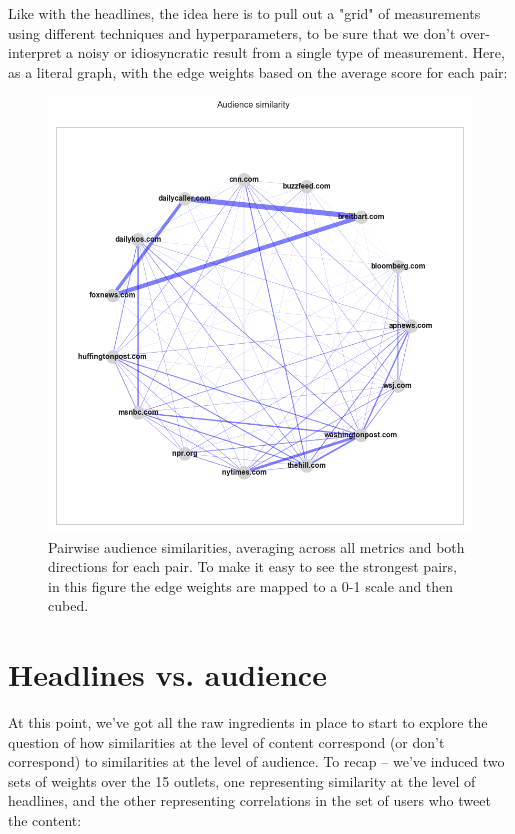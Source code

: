 \documentclass{scrartcl}
\begin{document}
Like with the headlines, the idea here is to pull out a "grid" of measurements using different techniques and hyperparameters, to be sure that we don't over-interpret a noisy or idiosyncratic result from a single type of measurement. Here, as a literal graph, with the edge weights based on the average score for each pair:

\begin{figure}[H]
  \centering
  \includegraphics[height=0.5\textheight]{figures/user-graph-radial-all-metrics.png}
  \caption{Pairwise audience similarities, averaging across all metrics and both directions for each pair. To make it easy to see the strongest pairs, in this figure the edge weights are mapped to a 0-1 scale and then cubed.}
\end{figure}

\section{Headlines vs. audience} \label{section:content-audience}

At this point, we've got all the raw ingredients in place to start to explore the question of how similarities at the level of content correspond (or don't correspond) to similarities at the level of audience. To recap -- we've induced two sets of weights over the 15 outlets, one representing similarity at the level of headlines, and the other representing correlations in the set of users who tweet the content:
\end{document}
